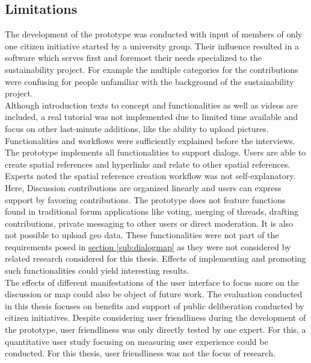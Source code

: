 \subsection{Limitations}
\label{sub:limitations}
The development of the prototype was conducted with input of members of only one citizen initiative started by a university group. Their influence resulted in a software which serves first and foremost their needs specialized to the sustainability project. For example the multiple categories for the contributions were confusing for people unfamiliar with the background of the sustainability project.\\
Although introduction texts to concept and functionalities as well as videos are included, a real tutorial was not implemented due to limited time available and focus on other last-minute additions, like the ability to upload pictures. Functionalities and workflows were sufficiently explained before the interviews.\\
The prototype implements all functionalities to support dialogs. Users are able to create spatial references and hyperlinks and relate to other spatial references. Experts noted the spatial reference creation workflow was not self-explanatory. Here,   Discussion contributions are organized linearly and users can express support by favoring contributions. The prototype does not feature functions found in traditional forum applications like voting, merging of threads, drafting contributions, private messaging to other users or direct moderation. It is also not possible to upload geo data. These functionalities were not part of the requirements posed in \hyperref[sub:dialogmap]{section \ref{sub:dialogmap}} as they were not considered by related research considered for this thesis. Effects of implementing and promoting such functionalities could yield interesting results.\\%
The effects of different manifestations of the user interface to focus more on the discussion or map could also be object of future work.
The evaluation conducted in this thesis focuses on benefits and support of public deliberation conducted by citizen initiatives. Despite considering user friendliness during the development of the prototype, user friendliness was only directly tested by one expert. For this, a quantitative user study focusing on measuring user experience could be conducted. For this thesis, user friendliness was not the focus of research.\\
